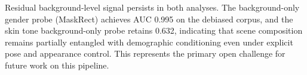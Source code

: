 Residual background-level signal persists in both analyses. The background-only gender
probe (MaskRect) achieves AUC 0.995 on the debiased corpus, and the skin tone
background-only probe retains 0.632, indicating that scene composition remains
partially entangled with demographic conditioning even under explicit pose and
appearance control. This represents the primary open challenge for future work on this
pipeline.